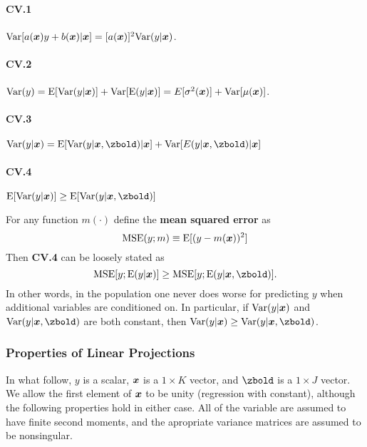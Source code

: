 \documentclass[11pt, oneside, a4paper, article]{article}
\numberwithin{equation}{section}
\begin{document}
\paragraph{CV.1}
$\text{Var}[ a(\boldsymbol{x}) y + b(\boldsymbol{x}) | \boldsymbol{x} ] = [a(\boldsymbol{x})]^2 \text{Var}(y | \boldsymbol{x})$.

\paragraph{CV.2}
$\text{Var}( y ) = \text{E}[ \text{Var}(y | \boldsymbol{x} ) ] + \text{Var}[\text{E}( y | \boldsymbol{x} ) ] = E[\sigma^{2}(\boldsymbol{x})] + \text{Var}[\mu(\boldsymbol{x})]$.

\paragraph{CV.3}
$\Var(y | \xvec) = \E[ \Var(y | \xvec, \zbold) | \xvec] + \Var[E(y | \xvec, \zbold ) | \xvec]$

\paragraph{CV.4}
$\E[ \Var(y | \xvec ) ] \geq \E[ \Var(y | \xvec, \zbold ) ]$

\begin{remark}
For any function $m(\cdot)$ define the \textbf{mean squared error} as
\begin{equation*}
	\text{MSE}( y ; m ) \equiv
	\text{E}[ ( y - m(\boldsymbol{x}) )^2 ]
\end{equation*}
Then \textbf{CV.4} can be loosely stated as
\begin{equation*}
	\MSE[ y ; \E(y | \xvec ) ] \geq 
	\MSE[ y ; \E(y | \xvec, \zbold ) ].
\end{equation*}
In other words, in the population one never does worse for predicting $y$ when additional variables are conditioned on.
In particular, if $\text{Var}(y | \boldsymbol{x})$ and $\Var(y | \xvec, \zbold)$ are both constant, then
$\Var(y | \xvec) \geq \Var(y | \xvec, \zbold)$.
\end{remark}

\clearpage
\subsubsection{Properties of Linear Projections}
In what follow, 
$y$ is a scalar,
$\boldsymbol{x}$ is a $1 \times K$ vector,
and $\zbold$ is a $1 \times J$ vector.
We allow the first element of $\boldsymbol{x}$ to be unity (regression with constant), although the following properties hold in either case.
All of the variable are assumed to have finite second moments, and the apropriate variance matrices are assumed to be nonsingular.
\end{document}
